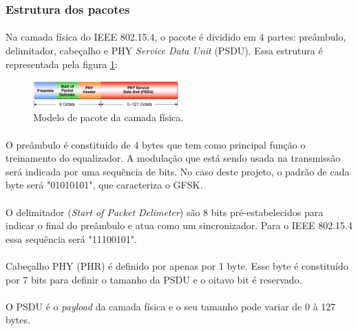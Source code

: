 \subsubsection{Estrutura dos pacotes}

\paragraph{} Na camada física do IEEE 802.15.4,
 o pacote é dividido em 4 partes: preâmbulo, delimitador, cabeçalho e PHY \textit{Service Data Unit} (PSDU). Essa estrutura é representada pela figura \ref{fig:figura4}:
 
 \begin{figure}[!ht]
	\centering
	\includegraphics[width=0.5\textwidth]{Figuras/pacote_PHY.PNG}   
	\caption{Modelo de pacote da camada física. \citep{EATON}}
	\label{fig:figura4}
\end{figure}

 
 \paragraph{} O preâmbulo é constituído de 4 bytes que tem como principal função o treinamento do equalizador. A modulação que está sendo usada na transmissão será indicada por uma sequência de bits. No caso deste projeto, o padrão de cada byte será "01010101", que caracteriza o GFSK.
 
 \paragraph{} O delimitador (\textit{Start of Packet Delimeter}) são 8 bits pré-estabelecidos para indicar o final do preâmbulo e atua como um sincronizador. Para o IEEE 802.15.4 essa sequência será "11100101".
 
 \paragraph{} Cabeçalho PHY (PHR) é definido por apenas por 1 byte. Esse byte é constituído por 7 bits para definir o tamanho da PSDU e o oitavo bit é reservado.
 
 \paragraph{} O PSDU é o \textit{payload} da camada física e o seu tamanho pode variar de 0 à 127 bytes.
 
